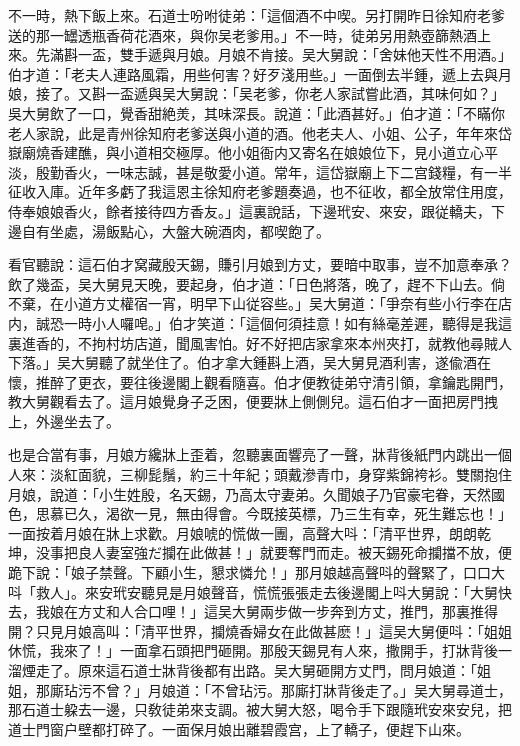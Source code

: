 不一時，熱下飯上來。石道士吩咐徒弟：「這個酒不中喫。另打開昨日徐知府老爹送的那一罎透瓶香荷花酒來，與你吴老爹用。」不一時，徒弟另用熱壺篩熱酒上來。先滿斟一盃，雙手遞與月娘。月娘不肯接。吴大舅說：「舍妹他天性不用酒。」伯才道：「老夫人連路風霜，用些何害？好歹淺用些。」一面倒去半鍾，遞上去與月娘，接了。又斟一盃遞與吴大舅說：「吴老爹，你老人家試嘗此酒，其味何如？」吳大舅飲了一口，覺香甜絶羙，其味深長。說道：「此酒甚好。」伯才道：「不瞞你老人家說，此是青州徐知府老爹送與小道的酒。他老夫人、小姐、公子，年年來岱嶽廟燒香建醮，與小道相交極厚。他小姐衙内又寄名在娘娘位下，見小道立心平淡，殷勤香火，一味志誠，甚是敬愛小道。常年，這岱嶽廟上下二宫錢糧，有一半征收入庫。近年多虧了我這恩主徐知府老爹題奏過，也不征收，都全放常住用度，侍奉娘娘香火，餘者接待四方香友。」這裏說話，下邊玳安、來安，跟従轎夫，下邊自有坐處，湯飯點心，大盤大碗酒肉，都喫飽了。

看官聽說：這石伯才窝藏殷天錫，賺引月娘到方丈，要暗中取事，豈不加意奉承？飲了幾盃，吴大舅見天晚，要起身，伯才道：「日色將落，晚了，趕不下山去。倘不棄，在小道方丈權宿一宵，明早下山従容些。」吴大舅道：「爭奈有些小行李在店内，誠恐一時小人囉唣。」伯才笑道：「這個何須挂意！如有絲毫差遲，聽得是我這裏進香的，不拘村坊店道，聞風害怕。好不好把店家拿來本州夾打，就教他尋賊人下落。」吴大舅聽了就坐住了。伯才拿大鍾斟上酒，吴大舅見酒利害，遂偸酒在懷，推醉了更衣，要往後邊閣上觀看隨喜。伯才便教徒弟守清引領，拿鑰匙開門，教大舅觀看去了。這月娘覺身子乏困，便要牀上側側兒。這石伯才一面把房門拽上，外邊坐去了。

也是合當有事，月娘方纔牀上歪着，忽聽裏面響亮了一聲，牀背後紙門内跳出一個人來：淡紅面貌，三柳髭鬚，約三十年紀；頭戴滲青巾，身穿紫錦袴衫。雙關抱住月娘，說道：「小生姓殷，名天錫，乃高太守妻弟。久聞娘子乃官豪宅眷，天然國色，思慕已久，渴欲一見，無由得會。今既接英標，乃三生有幸，死生難忘也！」一面按着月娘在牀上求歡。月娘唬的慌做一團，高聲大呌：「清平世界，朗朗乾坤，没事把良人妻室強だ攔在此做甚！」就要奪門而走。被天錫死命攔擋不放，便跪下說：「娘子禁聲。下顧小生，懇求憐允！」那月娘越高聲呌的聲緊了，口口大呌「救人」。來安玳安聽見是月娘聲音，慌慌張張走去後邊閣上呌大舅說：「大舅快去，我娘在方丈和人合口哩！」這吴大舅兩步做一步奔到方丈，推門，那裏推得開？只見月娘高叫：「清平世界，攔燒香婦女在此做甚麽！」這吴大舅便呌：「姐姐休慌，我來了！」一面拿石頭把門砸開。那殷天錫見有人來，撒開手，打牀背後一溜煙走了。原來這石道士牀背後都有出路。吴大舅砸開方丈門，問月娘道：「姐姐，那廝玷污不曾？」月娘道：「不曾玷污。那廝打牀背後走了。」吴大舅尋道士，那石道士躱去一邊，只敎徒弟來支調。被大舅大怒，喝令手下跟隨玳安來安兒，把道士門窗户壁都打碎了。一面保月娘出離碧霞宫，上了轎子，便趕下山來。

